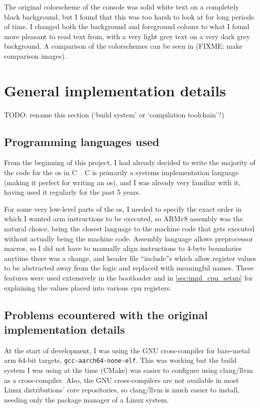 \documentclass{article}
\begin{document}
The original colorscheme of the console was solid white text on a completely
black background, but I found that this was too harsh to look at for long
periods of time. I changed both the background and foreground colours to what I
found more pleasant to read text from, with a very light grey text on a very
dark grey background. A comparison of the colorschemes can be seen in (FIXME: make comparison images).

\section{General implementation details}
TODO: rename this section (`build system' or `compilation toolchain'?)
\subsection{Programming languages used}
From the beginning of this project, I had already decided to write the majority
of the code for the \gls{os} in C~\cite{c-programming-language}. C is primarily
a systems implementation language (making it perfect for writing an \gls{os}),
and I was already very familiar with it, having used it regularly for the past
5 years.

For some very low-level parts of the \gls{os}, I needed to specify the exact
order in which I wanted \gls{arm} instructions to be executed, so ARMv8
assembly was the natural choice, being the closest language to the machine code
that gets executed without actually being the machine code. Assembly language
allows preprocessor macros, so I did not have to manually align instructions to
4-byte boundaries anytime there was a change, and header file ``include''s
which allow register values to be abstracted away from the logic and replaced
with meaningful names. These features were used extensively in the bootloader
and in \autoref{sec:impl_cpu_setup} for explaining the values placed into
various \gls{cpu} registers.

\subsection{Problems ecountered with the original implementation details}
At the start of development, I was using the GNU cross-compiler for bare-metal
\gls{arm} 64-bit targets, \texttt{gcc-aarch64-none-elf}. This was working but
the build system I was using at the time (CMake) was easier to configure using
clang/llvm as a cross-compiler. Also, the GNU cross-compilers are not available
in most Linux distributions' core repositories, so clang/llvm is much easier to
install, needing only the package manager of a Linux system.
\end{document}
